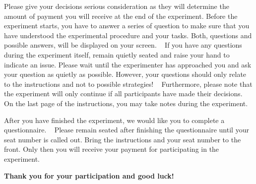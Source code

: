 \documentclass[11pt]{scrartcl}
\begin{document}

Please give your decisions serious consideration as they will determine the amount of payment you will receive at the end of the experiment. Before the experiment starts, you have to answer a series of question to make sure that you have understood the experimental procedure and your tasks. Both, questions and possible answers, will be displayed on your screen. ~\bigbreak
If you have any questions during the experiment itself, remain quietly seated and raise your hand to indicate an issue. Please wait until the experimenter has approached you and ask your question as quietly as possible. However, your questions should only relate to the instructions and not to possible strategies! ~\bigbreak
Furthermore, please note that the experiment will only continue if all participants have made their decisions. ~\bigbreak
On the last page of the instructions, you may take notes during the experiment.


After you have finished the experiment, we would like you to complete a questionnaire. ~\bigbreak
Please remain seated after finishing the questionnaire until your seat number is called out. Bring the instructions and your seat number to the front. Only then you will receive your payment for participating in the experiment.

   \addvspace{1.5cm}
   
\textbf{Thank you for your participation and good luck!}
 
\end{document}
